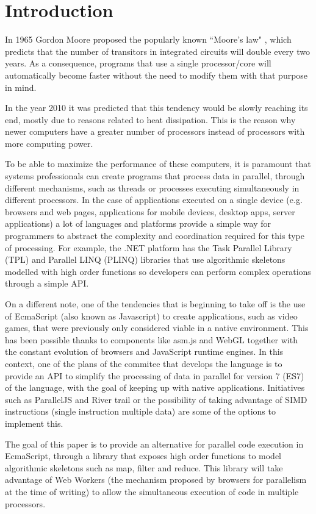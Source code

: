 \section{Introduction}
In 1965 Gordon Moore proposed the popularly known ``Moore's law" \cite{moore65}, which predicts that the number of transitors in integrated circuits will double every two years.
As a consequence, programs that use a single processor/core will automatically become faster without the need to modify them with that purpose in mind.

In the year 2010 it was predicted that this tendency would be slowly reaching its end, mostly due to reasons related to heat dissipation. This is the reason why newer computers have a greater number of processors instead of processors with more computing power.

To be able to maximize the performance of these computers, it is paramount that systems professionals can create programs that process data in parallel, through different mechanisms, such as threads or processes executing simultaneously in different processors. In the case of applications executed on a single device (e.g. browsers and web pages, applications for mobile devices, desktop apps, server applications) a lot of languages and platforms provide a simple way for programmers to abstract the complexity and coordination required for this type of processing. For example, the .NET platform has the Task Parallel Library (TPL) and Parallel LINQ (PLINQ) \cite{ms-par} libraries that use algorithmic skeletons modelled with high order functions so developers can perform complex operations through a simple API.

On a different note, one of the tendencies that is beginning to take off is the use of EcmaScript \cite{es-web} (also known as Javascript) to create applications, such as video games, that were previously only considered viable in a native environment. This has been possible thanks to components like asm.js \cite{asm-web} and WebGL \cite{webgl-web} together with the constant evolution of browsers and JavaScript runtime engines.
In this context, one of the plans of the commitee that develops the language is to provide an API to simplify the processing of data in parallel for version 7 (ES7) of the language, with the goal of keeping up with native applications. Initiatives such as ParallelJS \cite{par-js} and River trail \cite{rivertrail} or the possibility of taking advantage of SIMD instructions \cite{js-simd} (single instruction multiple data) are some of the options to implement this.

The goal of this paper is to provide an alternative for parallel code execution in EcmaScript, through a library that exposes high order functions to model algorithmic skeletons such as map, filter and reduce. This library will take advantage of Web Workers \cite{w3c-ww} (the mechanism proposed by browsers for parallelism at the time of writing) to allow the simultaneous execution of code in multiple processors.

\pagebreak